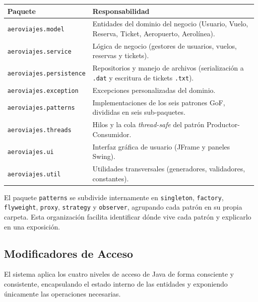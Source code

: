 \documentclass[12pt, letterpaper]{article}
\begin{document}
	\begin{table}[H]
		\centering
		\renewcommand{\arraystretch}{1.2}
		\begin{tabular}{p{4.5cm} p{10cm}}
			\toprule
			\textbf{Paquete} & \textbf{Responsabilidad} \\
			\midrule
			\texttt{aeroviajes.model} & Entidades del dominio del negocio (Usuario, Vuelo, Reserva, Ticket, Aeropuerto, Aerolínea). \\
			\texttt{aeroviajes.service} & Lógica de negocio (gestores de usuarios, vuelos, reservas y tickets). \\
			\texttt{aeroviajes.persistence} & Repositorios y manejo de archivos (serialización a \texttt{.dat} y escritura de tickets \texttt{.txt}). \\
			\texttt{aeroviajes.exception} & Excepciones personalizadas del dominio. \\
			\texttt{aeroviajes.patterns} & Implementaciones de los seis patrones GoF, divididas en seis sub-paquetes. \\
			\texttt{aeroviajes.threads} & Hilos y la cola \textit{thread-safe} del patrón Productor-Consumidor. \\
			\texttt{aeroviajes.ui} & Interfaz gráfica de usuario (JFrame y paneles Swing). \\
			\texttt{aeroviajes.util} & Utilidades transversales (generadores, validadores, constantes). \\
			\bottomrule
		\end{tabular}
	\end{table}
	
	El paquete \texttt{patterns} se subdivide internamente en \texttt{singleton}, \texttt{factory}, \texttt{flyweight}, \texttt{proxy}, \texttt{strategy} y \texttt{observer}, agrupando cada patrón en su propia carpeta. Esta organización facilita identificar dónde vive cada patrón y explicarlo en una exposición.
	
	\subsection{Modificadores de Acceso}
	El sistema aplica los cuatro niveles de acceso de Java de forma consciente y consistente, encapsulando el estado interno de las entidades y exponiendo únicamente las operaciones necesarias.
	
\end{document}
